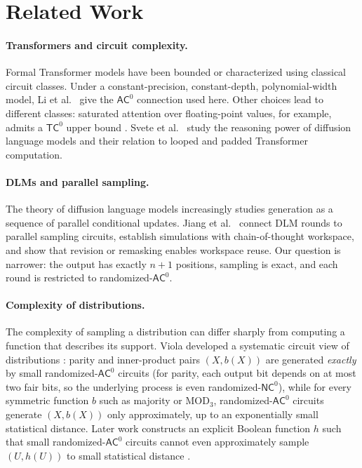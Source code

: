 \documentclass[10pt]{article}
\theoremstyle{definition}
\newcommand{\AC}{\mathsf{AC}}
\newcommand{\TC}{\mathsf{TC}}
\newcommand{\NC}{\mathsf{NC}}
\begin{document}
\section{Related Work}
\label{sec:related}

\paragraph{Transformers and circuit complexity.}
Formal Transformer models have been bounded or characterized using classical
circuit classes.  Under a constant-precision, constant-depth, polynomial-width
model, Li et al.~\cite{li2024cot} give the $\AC^0$ connection used here.
Other choices lead to different classes: saturated attention over
floating-point values, for example, admits a $\TC^0$ upper bound
\cite{merrill2022saturated}.  Svete et al.~\cite{svete2026reasoning} study
the reasoning power of diffusion language models and their relation to looped
and padded Transformer computation.

\paragraph{DLMs and parallel sampling.}
The theory of diffusion language models increasingly studies generation as a
sequence of parallel conditional updates.  Jiang et al.~\cite{jiang2026dlm}
connect DLM rounds to parallel sampling circuits, establish simulations with
chain-of-thought workspace, and show that revision or remasking enables
workspace reuse.  Our question is narrower: the output has exactly $n+1$
positions, sampling is exact, and each round is restricted to
randomized-$\AC^0$.

\paragraph{Complexity of distributions.}
The complexity of sampling a distribution can differ sharply from computing a
function that describes its support.  Viola developed a systematic circuit
view of distributions \cite{viola2012complexity}: parity and inner-product
pairs $(X,b(X))$ are generated \emph{exactly} by small randomized-$\AC^0$
circuits (for parity, each output bit depends on at most two fair bits, so
the underlying process is even randomized-$\NC^0$),
while for every symmetric function $b$ such as majority or $\mathrm{MOD}_3$,
randomized-$\AC^0$ circuits generate $(X,b(X))$ only approximately, up to an
exponentially small statistical distance.  Later work constructs an explicit
Boolean function $h$ such that small randomized-$\AC^0$ circuits cannot even
approximately sample $(U,h(U))$ to small statistical distance
\cite{viola2020sampling}.
\end{document}
